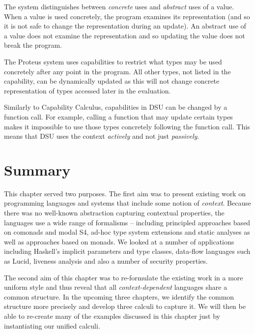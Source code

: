 The system distinguishes between \emph{concrete} uses and \emph{abstract} uses of a value. When
a value is used concretely, the program examines its representation (and so it is not safe to
change the representation during an update). An abstract use of a value does not examine
the representation and so updating the value does not break the program.

The Proteus system uses capabilities to restrict what types may be used concretely after any point
in the program. All other types, not listed in the capability, can be dynamically updated as this
will not change concrete representation of types accessed later in the evaluation.

Similarly to Capability Calculus, capabilities in DSU can be changed by a function call. For
example, calling a function that may update certain types makes it impossible to use those types
concretely following the function call. This means that DSU uses the context \emph{actively}
and not just \emph{passively}.


%
%

\section{Summary}

This chapter served two purposes. The first aim was to present existing work on programming
languages and systems that include some notion of \emph{context}. Because there was no well-known
abstraction capturing contextual properties, the languages use a wide range of formalisms -- including
principled approaches based on comonads and modal S4, ad-hoc type system extensions and static analyses
as well as approaches based on monads. We looked at a number of applications including Haskell's implicit
parameters and type classes, data-flow languages such as Lucid, liveness analysis and also a number of
security properties.

The second aim of this chapter was to re-formulate the existing work in a more uniform style and thus
reveal that all \emph{context-dependent} languages share a common structure. In the upcoming three
chapters, we identify the common structure more precisely and develop three calculi to capture it. We
will then be able to re-create many of the examples discussed in this chapter just by instantiating our
unified calculi.

